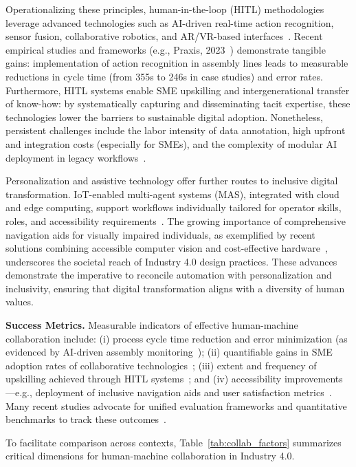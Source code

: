 \documentclass[sigconf]{acmart}
\begin{document}
Operationalizing these principles, human-in-the-loop (HITL) methodologies leverage advanced technologies such as AI-driven real-time action recognition, sensor fusion, collaborative robotics, and AR/VR-based interfaces~\cite{ref17,ref27,ref29,ref37,ref38,ref42,ref43,ref45,ref46,ref54,ref89}. Recent empirical studies and frameworks (e.g., Praxis, 2023~\cite{ref46}) demonstrate tangible gains: implementation of action recognition in assembly lines leads to measurable reductions in cycle time (from 355s to 246s in case studies) and error rates. Furthermore, HITL systems enable SME upskilling and intergenerational transfer of know-how: by systematically capturing and disseminating tacit expertise, these technologies lower the barriers to sustainable digital adoption. Nonetheless, persistent challenges include the labor intensity of data annotation, high upfront and integration costs (especially for SMEs), and the complexity of modular AI deployment in legacy workflows~\cite{ref17,ref90}.

Personalization and assistive technology offer further routes to inclusive digital transformation. IoT-enabled multi-agent systems (MAS), integrated with cloud and edge computing, support workflows individually tailored for operator skills, roles, and accessibility requirements~\cite{ref54,ref45}. The growing importance of comprehensive navigation aids for visually impaired individuals, as exemplified by recent solutions combining accessible computer vision and cost-effective hardware~\cite{ref65}, underscores the societal reach of Industry 4.0 design practices. These advances demonstrate the imperative to reconcile automation with personalization and inclusivity, ensuring that digital transformation aligns with a diversity of human values.

\textbf{Success Metrics.} Measurable indicators of effective human-machine collaboration include: (i) process cycle time reduction and error minimization (as evidenced by AI-driven assembly monitoring~\cite{ref46}); (ii) quantifiable gains in SME adoption rates of collaborative technologies~\cite{ref89}; (iii) extent and frequency of upskilling achieved through HITL systems~\cite{ref17}; and (iv) accessibility improvements—e.g., deployment of inclusive navigation aids and user satisfaction metrics~\cite{ref65}. Many recent studies advocate for unified evaluation frameworks and quantitative benchmarks to track these outcomes~\cite{ref17,ref54}.

To facilitate comparison across contexts, Table~\ref{tab:collab_factors} summarizes critical dimensions for human-machine collaboration in Industry 4.0.
\end{document}
